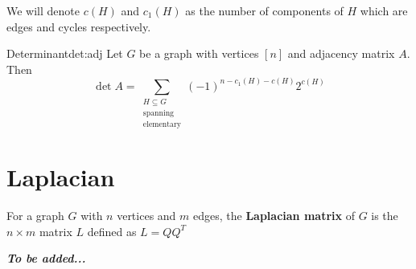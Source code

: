 \documentclass[../basic_graph_theory.tex]{subfiles}
\begin{document}
We will denote \(c(H)\) and \(c_1(H)\) as the number of components of \(H\) which are edges and cycles respectively.

\begin{Thm}{Determinant}{det:adj}
  Let \(G\) be a graph with vertices \([n]\) and adjacency matrix \(A\). Then
  \[
    \det A = \sum_{\substack{H \subseteq G \\ \text{spanning} \\ \text{elementary}}} (-1)^{n - c_1(H) - c(H)} 2^{c(H)}
  \]
\end{Thm}

\section{Laplacian}

For a graph $G$ with $n$ vertices and $m$ edges, the \textbf{Laplacian matrix} of $G$ is the $n \times m$ matrix $L$ defined as \(L = QQ^T\)

\ssk

\textit{\textbf{To be added...}}
\end{document}
